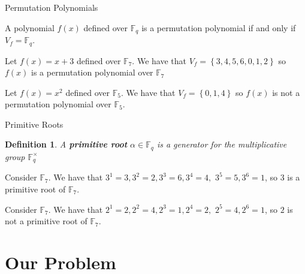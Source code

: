 \documentclass{beamer}
\newtheorem*{definition*}{Definition}
\begin{document}
\begin{frame}{Permutation Polynomials}

\begin{definition}
  A polynomial $f(x)$ defined over $\mathbb{F}_{q}$ is a permutation polynomial if and only if  $V_{f} = \mathbb{F}_{q}$.
\end{definition}


\begin{example}
  Let $f(x) = x+3$ defined over $\mathbb{F}_{7}$. We have that $V_{f} = \left\{3, 4, 5, 6, 0, 1, 2 \right\}$ so $f(x)$ is a permutation polynomial over $\mathbb{F}_{7}$
\end{example}

\begin{example}
Let $f(x) = x^2$ defined over $\mathbb{F}_{5}$. We have that $V_{f} = \left\{0, 1, 4 \right\}$ so $f(x)$ is not a permutation polynomial over $\mathbb{F}_{5}$.
\end{example}

\end{frame}


\begin{frame}{Primitive Roots}

\begin{definition*}
  A \textbf{primitive root} $\alpha \in \mathbb{F}_q$ is a generator for the multiplicative group $\mathbb{F}_{q}^{\times}$
\end{definition*}

\begin{example}
  Consider $\mathbb{F}_{7}$. We have that $3^1 = 3, 3^2 = 2, 3^3 = 6, 3^4 = 4,$ $ 3^5 = 5, 3^6 = 1$, so $3$ is a primitive root of $\mathbb{F}_{7}$.
\end{example}

\begin{example}
  Consider $\mathbb{F}_{7}$. We have that $2^1 = 2, 2^2 = 4, 2^3 = 1, 2^4 = 2,$ $ 2^5 = 4, 2^6 = 1$, so $2$ is not a primitive root of $\mathbb{F}_{7}$.
\end{example}

\end{frame}


\section{Our Problem} %
\label{sec:our_problem}

\end{document}
